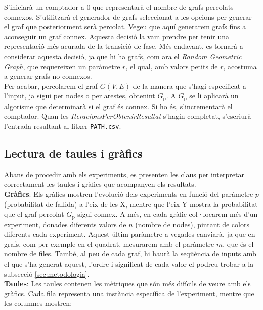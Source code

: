 \documentclass[a4paper]{article}
\begin{document}
	S'iniciarà un comptador a 0 que representarà el nombre de grafs percolats connexos. S'utilitzarà el generador de grafs seleccionat a les opcions per generar el graf que posteriorment serà percolat. Vegeu que aquí generarem grafs fins a aconseguir un graf connex. Aquesta decisió la vam prendre per tenir una representació més acurada de la transició de fase. Més endavant, es tornarà a considerar aquesta decisió, ja que hi ha grafs, com ara el \textit{Random Geometric Graph}, que requereixen un paràmetre $r$, el qual, amb valors petits de $r$, acostuma a generar grafs no connexos. \\
	
	Per acabar, percolarem el graf $G(V,E)$ de la manera que s'hagi especificat a l'input, ja sigui per nodes o per arestes, obtenint $G_{\text{p}}$. A $G_{\text{p}}$ se li aplicarà un algorisme que determinarà si el graf és connex. Si ho és, s'incrementarà el comptador. Quan les \textit{IteracionsPerObtenirResultat} s'hagin completat, s'escriurà l'entrada resultant al fitxer \texttt{PATH.csv}.
	
	\subsection{Lectura de taules i gràfics}
	
	Abans de procedir amb els experiments, es presenten les claus per interpretar correctament les taules i gràfics que acompanyen els resultats. \\
	
	\textbf{Gràfics}: Els gràfics mostren l'evolució dels experiments en funció del paràmetre $p$ (probabilitat de fallida) a l'eix de les X, mentre que l'eix Y mostra la probabilitat que el graf percolat $G_{\text{p}}$ sigui connex. A més, en cada gràfic col·locarem més d'un experiment, donades diferents valors de $n$ (nombre de nodes), pintant de colors diferents cada experiment. Aquest últim paràmetre a vegades canviarà, ja que en grafs, com per exemple en el quadrat, mesurarem amb el paràmetre $m$, que és el nombre de files. També, al peu de cada graf, hi haurà la seqüència de inputs amb el que s'ha generat aquest, l'ordre i significat de cada valor el podreu trobar a la subsecció \ref{sec:metodologia}. \\
	
	\textbf{Taules}: Les taules contenen les mètriques que són més difícils de veure amb els gràfics. Cada fila representa una instància específica de l'experiment, mentre que les columnes mostren:
	
\end{document}
